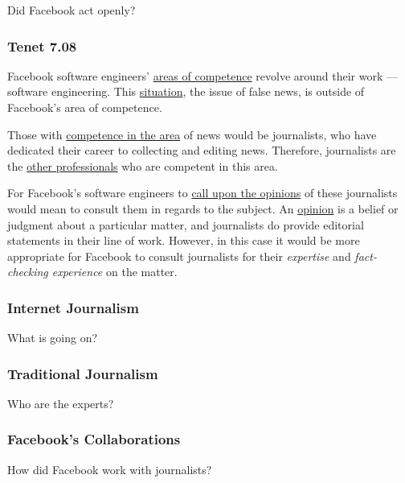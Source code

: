 \par Did Facebook act openly?

\subsubsection{Tenet 7.08}


\par Facebook software engineers' \ul{areas of competence} revolve around their work --- software engineering. This \ul{situation}, the issue of false news, is outside of Facebook's area of competence.

\par Those with \ul{competence in the area} of news would be journalists, who have dedicated their career to collecting and editing news. \cite{dictionary} Therefore, journalists are the \ul{other professionals} who are competent in this area.

\par For Facebook's software engineers to \ul{call upon the opinions} of these journalists would mean to consult them in regards to the subject. An \ul{opinion} is a belief or judgment about a particular matter, \cite{dictionary} and journalists do provide editorial statements in their line of work. However, in this case it would be more appropriate for Facebook to consult journalists for their \emph{expertise} and \emph{fact-checking experience} on the matter.


%
\subsubsection{Internet Journalism}

\par What is going on?

%
\subsubsection{Traditional Journalism}

\par Who are the experts?

%
\subsubsection{Facebook's Collaborations}

\par How did Facebook work with journalists?
